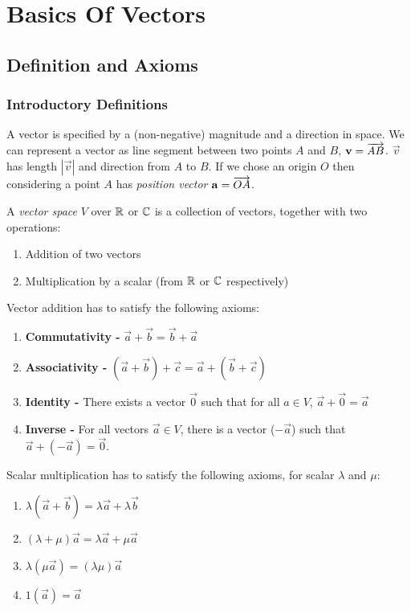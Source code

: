 \documentclass[../main.tex]{subfiles}
\begin{document}
\chapter{Basics Of Vectors}
\section{Definition and Axioms}
\subsection{Introductory Definitions}
A vector is specified by a (non-negative) magnitude and a direction in space.
We can represent a vector as line segment between two points $A$ and $B$, $\mathbf{\bm{v}} = \overrightarrow{AB}$.
$\vec{v}$ has length $|\vec{v}|$ and direction from $A$ to $B$.
If we chose an origin $O$ then considering a point $A$ has \textit{position vector} $\mathbf{\bm{a}} = \overrightarrow{OA}$.
\begin{definition}
  A \textit{vector space} $V$ over $\mathbb{R}$ or $\mathbb{C}$ is a collection of vectors, together with two operations: \label{vectorSpaceDef}
  \begin{enumerate}
    \item Addition of two vectors
    \item Multiplication by a scalar (from $\mathbb{R}$ or $\mathbb{C}$ respectively)
  \end{enumerate}
\end{definition}
Vector addition has to satisfy the following axioms:
\begin{enumerate}
  \item \textbf{Commutativity -} $\vec{a} + \vec{b} = \vec{b} + \vec{a}$
  \item \textbf{Associativity -} $(\vec{a} + \vec{b}) + \vec{c} = \vec{a} + (\vec{b} + \vec{c})$
  \item \textbf{Identity -} There exists a vector $\vec{0}$ such that for all $a \in V$, $\vec{a} + \vec{0} = \vec{a}$
  \item \textbf{Inverse -} For all vectors $\vec{a} \in V$, there is a vector ($-\vec{a}$) such that $\vec{a} + (-\vec{a}) = \vec{0}$.
\end{enumerate}
Scalar multiplication has to satisfy the following axioms, for scalar $\lambda$ and $\mu$:
\begin{enumerate}
  \item $\lambda(\vec{a} + \vec{b}) = \lambda \vec{a} + \lambda \vec{b}$
  \item $(\lambda + \mu)\vec{a} = \lambda \vec{a} + \mu \vec{a}$
  \item $\lambda(\mu \vec{a}) = (\lambda \mu)\vec{a}$
  \item $1(\vec{a}) = \vec{a}$
\end{enumerate}
\end{document}
